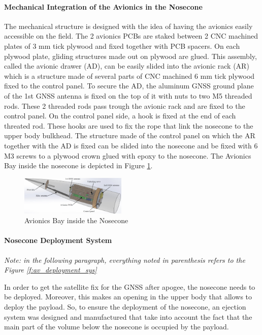 \paragraph{Mechanical Integration of the Avionics in the Nosecone}
 \hfill \break
The mechanical structure is designed with the idea of having the avionics easily accessible on the field. The 2 avionics PCBs are staked between 2 CNC machined plates of 3 mm tick plywood and fixed together with PCB spacers. On each plywood plate, gliding structures made out on plywood are glued. This assembly, called the avionic drawer (AD), can be easily slided into the avionic rack (AR) which is a structure made of several parts of CNC machined 6 mm tick plywood fixed to the control panel. To secure the AD, the aluminum GNSS ground plane of the 1st GNSS antenna is fixed on the top of it with nuts to two M5 threaded rods. These 2 threaded rods pass trough the avionic rack and are fixed to the control panel. On the control panel side, a hook is fixed at the end of each threated rod. These hooks are used to fix the rope that link the nosecone to the upper body bulkhead. The structure made of the control panel on which the AR together with the AD is fixed can be slided into the nosecone and be fixed with 6 M3 screws to a plywood crown glued with epoxy to the nosecone. The Avionics Bay inside the nosecone is depicted in Figure \ref{f:avionics_bay}.

  \begin{figure}[h!]
 	\centering
        \includegraphics[width=0.45\textwidth]{img/AV_FIG_CAD_nosecone.jpg}
        \caption{Avionics Bay inside the Nosecone}
        \label{f:avionics_bay}
 \end{figure}

\paragraph{Nosecone Deployment System}
 \hfill \break
\textit{Note: in the following paragraph, everything noted in parenthesis refers to the Figure \ref{f:av_deployment_sys}}

In order to get the satellite fix for the GNSS after apogee, the nosecone needs to be deployed. Moreover, this makes an opening in the upper body that allows to deploy the payload. So, to ensure the deployment of the nosecone, an ejection system was designed and manufactured that take into account the fact that the
main part of the volume below the nosecone is occupied by the payload.

